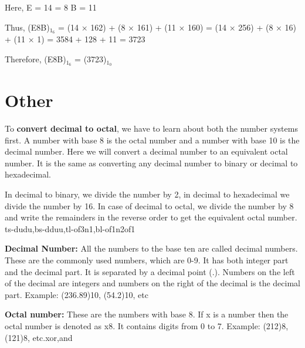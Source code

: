 \documentclass[pstricks,border=11pt]{article}
\begin{document}
\hfill \break
Here,
\hfill \break
E = 14
\hfill {} = 8
\hfill \break
B = 11

\hfill \break
Thus,
\hfill \break
(E8B)$_1_6$ = (14 × 162) + (8 × 161) + (11 × 160)
\hfill \break
= (14 × 256) + (8 × 16) + (11 × 1)
\hfill \break
= 3584 + 128 + 11
\hfill \break
= 3723

\hfill \break
Therefore, (E8B)$_1_6$ = (3723)$_1_0$
\hfill \break

\section{Other}
To \textbf{convert decimal to octal}, we have to learn about both the number systems first. A number with base 8 is the octal number and a number with base 10 is the decimal number. Here we will convert a decimal number to an equivalent octal number. It is the same as converting any decimal number to binary or decimal to hexadecimal.


\hfill \break
In decimal to binary, we divide the number by 2, in decimal to hexadecimal we divide the number by 16. In case of decimal to octal, we divide the number by 8 and write the remainders in the reverse order to get the equivalent octal number. ts-dudu,bs-dduu,tl-of3n1,bl-of1n2of1

\hfill \break
\textbf{Decimal Number:} All the numbers to the base ten are called decimal numbers. These are the commonly used numbers, which are 0-9. It has both integer part and the decimal part. It is separated by a decimal point (.). Numbers on the left of the decimal are integers and numbers on the right of the decimal is the decimal part. Example: (236.89)10, (54.2)10, etc

\hfill \break
\textbf{Octal number:} These are the numbers with base 8. If x is a number then the octal number is denoted as x8. It contains digits from 0 to 7. Example: (212)8, (121)8, etc.xor,and
\end{document}
